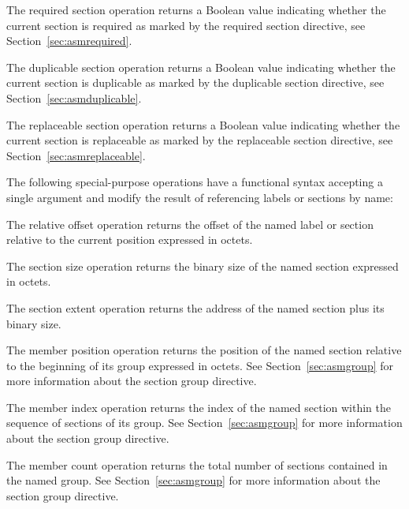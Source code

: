 \begin{itemize}

The required section operation returns a Boolean value indicating whether the current section is required as marked by the required section directive, see Section~\ref{sec:asmrequired}.


The duplicable section operation returns a Boolean value indicating whether the current section is duplicable as marked by the duplicable section directive, see Section~\ref{sec:asmduplicable}.


The replaceable section operation returns a Boolean value indicating whether the current section is replaceable as marked by the replaceable section directive, see Section~\ref{sec:asmreplaceable}.

\end{itemize}

The following special-purpose operations have a functional syntax accepting a single argument and modify the result of referencing labels or sections by name:

\begin{itemize}


The relative offset operation returns the offset of the named label or section relative to the current position expressed in octets.


The section size operation returns the binary size of the named section expressed in octets.


The section extent operation returns the address of the named section plus its binary size.


The member position operation returns the position of the named section relative to the beginning of its group expressed in octets.
See Section~\ref{sec:asmgroup} for more information about the section group directive.


The member index operation returns the index of the named section within the sequence of sections of its group.
See Section~\ref{sec:asmgroup} for more information about the section group directive.


The member count operation returns the total number of sections contained in the named group.
See Section~\ref{sec:asmgroup} for more information about the section group directive.

\end{itemize}

